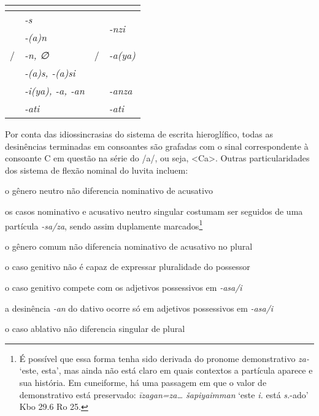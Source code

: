 \begin{center}
	\begin{tabular}[c]{llll}
		\toprule
		                      & \Sg{}\emph{}             &                       & \Pl{}\emph{}                   \\
		\midrule
		\Nom{} \Com{}         & \emph{-s}                & \Nom{} \Com{}         & \multirow{2}{4em}{\emph{-nzi}} \\
		\Acu{} \Com{}         & \emph{-{(a)}n}           & \Acu{} \Com{}         &                                \\
		\Nom{}/\Acu{} \Neut{} & \emph{-n, ∅}             & \Nom{}/\Acu{} \Neut{} & \emph{-a{(ya)}}                \\
		\Gen{}                & \emph{-{(a)}s, -{(a)}si} &                       &                                \\
		\Dat{}                & \emph{-i{(ya)}, -a, -an} & \Dat{}                & \emph{-anza}                   \\
		\Abl{}                & \emph{-ati}              & \Abl{}                & \emph{-ati}                    \\
		\bottomrule
	\end{tabular}
\end{center}

Por conta das idiossincrasias do sistema de escrita hieroglífico, todas as
desinências terminadas em consoantes são grafadas com o sinal correspondente à
consoante C em questão na série do /a/, ou seja, <Ca>.
Outras particularidades dos sistema de flexão nominal do luvita incluem:
\begin{compactitem}
	\item o gênero neutro não diferencia nominativo de acusativo
	\item os casos nominativo e acusativo neutro singular costumam ser seguidos de
	uma partícula \emph{-sa\slash{}za}, sendo assim duplamente
	marcados\footnote{É possível que essa forma tenha sido derivada do pronome
		demonstrativo \emph{za-} `este, esta', mas ainda não está claro em quais
		contextos a partícula aparece e sua história. Em cuneiforme, há uma passagem
		em que o valor de demonstrativo está preservado: \emph{īzagan=za\ldots{}
			šapiyaimman} `este \emph{i.} está \emph{s.}-ado' Kbo 29.6 Ro 25.}
	\item o gênero comum não diferencia nominativo de acusativo no plural
	\item o caso genitivo não é capaz de expressar pluralidade do possessor
	\item o caso genitivo compete com os adjetivos possessivos em
	\emph{-asa\slash{}i}
	\item a desinência \emph{-an} do dativo ocorre só em adjetivos possessivos
	em \emph{-asa\slash{}i}
	\item o caso ablativo não diferencia singular de plural
\end{compactitem}

